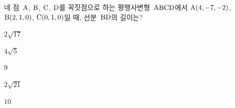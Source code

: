 네 점~$\mathrm{A}$, $\mathrm{B}$, $\mathrm{C}$, $\mathrm{D}$를 꼭짓점으로 하는 평행사변형~$\mathrm{ABCD}$에서 $\mathrm{A}(4{,}\mkern3mu\mathopen{}-7{,}\mkern3mu\mathopen{}-2)$, $\mathrm{B}(2{,}\mkern3mu\mathopen{}1{,}\mkern3mu\mathopen{}0)$, $\mathrm{C}(0{,}\mkern3mu\mathopen{}1{,}\mkern3mu\mathopen{}0)$일 때, 선분~$\mathrm{BD}$의 길이는?
\begin{choices32}{\rule[-3ex]{0pt}{8ex}$2\sqrt{17}$}{\rule[-3ex]{0pt}{8ex}$4\sqrt{5}$}{\rule[-3ex]{0pt}{8ex}$9$}{\rule[-3ex]{0pt}{8ex}$2\sqrt{21}$}{\rule[-3ex]{0pt}{8ex}$10$}\end{choices32}
